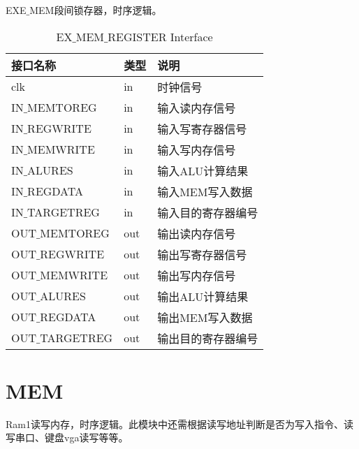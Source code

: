 EXE$\_$MEM段间锁存器，时序逻辑。

\begin{table}[H]
\begin{center}
\renewcommand{\arraystretch}{1.3}
\small
\caption{EX$\_$MEM$\_$REGISTER Interface}
\label{tab:treatments}
\begin{tabular}{|p{3cm}<{\centering}|p{1.4cm}<{\centering}|p{7cm}<{\centering}|}
\hline
接口名称 & 类型 & 说明 \\
\hline
clk & in & 时钟信号 \\
\hline
IN$\_$MEMTOREG & in & 输入读内存信号 \\
\hline
IN$\_$REGWRITE & in & 输入写寄存器信号 \\
\hline
IN$\_$MEMWRITE & in & 输入写内存信号 \\
\hline
IN$\_$ALURES & in & 输入ALU计算结果 \\
\hline
IN$\_$REGDATA & in & 输入MEM写入数据 \\
\hline
IN$\_$TARGETREG & in & 输入目的寄存器编号 \\
\hline
OUT$\_$MEMTOREG & out & 输出读内存信号 \\
\hline
OUT$\_$REGWRITE & out & 输出写寄存器信号 \\
\hline
OUT$\_$MEMWRITE & out & 输出写内存信号 \\
\hline
OUT$\_$ALURES & out & 输出ALU计算结果 \\
\hline
OUT$\_$REGDATA & out & 输出MEM写入数据 \\
\hline
OUT$\_$TARGETREG & out & 输出目的寄存器编号 \\
\hline
\end{tabular}
\end{center}
\end{table}


\section{MEM}

Ram1读写内存，时序逻辑。此模块中还需根据读写地址判断是否为写入指令、读写串口、键盘vga读写等等。

